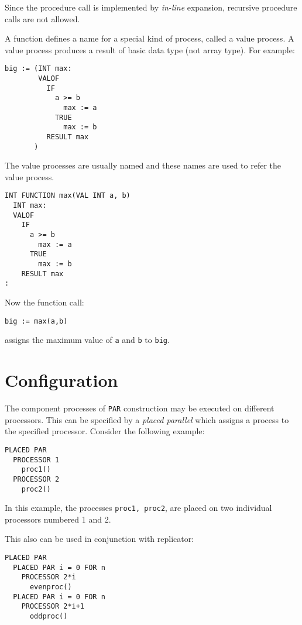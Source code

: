 Since the procedure call is implemented by {\em in-line}
expansion, recursive procedure calls are not allowed.


A function defines a name for a special kind of process, called a
value process.  A value process produces a result of basic data type
(not array type).  For example:
\begin{lin}
\begin{verbatim}
big := (INT max:
        VALOF
          IF
            a >= b
              max := a
            TRUE
              max := b
          RESULT max
       )
\end{verbatim}
\end{lin}

The value processes are usually named and these names are used to
refer the value process.
\begin{lin}
\begin{verbatim}
INT FUNCTION max(VAL INT a, b)
  INT max:
  VALOF
    IF
      a >= b
        max := a
      TRUE
        max := b
    RESULT max
:
\end{verbatim}
\end{lin}
Now the function call:
\begin{lin}
\begin{verbatim}
big := max(a,b)
\end{verbatim}
\end{lin}
assigns the maximum value of {\tt a} and {\tt b} to {\tt big}.

\section{Configuration}


The component processes of {\tt PAR} construction may be executed
on different processors.  This can be specified by a {\em placed
parallel} which assigns a process to the specified
processor.  Consider the following example:
\begin{lin}
\begin{verbatim}
PLACED PAR
  PROCESSOR 1
    proc1()
  PROCESSOR 2
    proc2()
\end{verbatim}
\end{lin}
In this example, the processes {\tt proc1, proc2}, are placed on two
individual processors numbered 1 and 2.

This also can be used in conjunction with replicator:
\begin{lin}
\begin{verbatim}
PLACED PAR 
  PLACED PAR i = 0 FOR n
    PROCESSOR 2*i
      evenproc()
  PLACED PAR i = 0 FOR n
    PROCESSOR 2*i+1
      oddproc()
\end{verbatim}
\end{lin}

